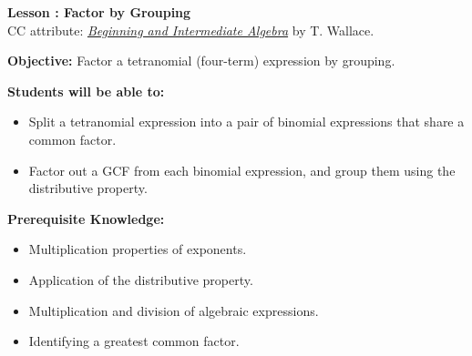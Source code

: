 \documentclass[12pt]{article}
\theoremstyle{definition}
\begin{document}
{\bf \large Lesson : Factor by Grouping}
\\ CC attribute: \href{http://www.wallace.ccfaculty.org/book/book.html}{\it{Beginning and Intermediate Algebra}} by T. Wallace. 
\hfill \doclicenseImage[imagewidth=5em]\\
\par
{\bf Objective:} Factor a tetranomial (four-term) expression by grouping.\\
\par
{\bf Students will be able to:}
\begin{itemize}
	\item Split a tetranomial expression into a pair of binomial  expressions that share a common factor.
	\item Factor out a GCF from each binomial expression, and group them using the distributive property.
\end{itemize}
{\bf Prerequisite Knowledge:}
\begin{itemize}
	\item Multiplication properties of exponents.
	\item Application of the distributive property.
	\item Multiplication and division of algebraic expressions.
	\item Identifying a greatest common factor.
\end{itemize}
\hrulefill
\end{document}
